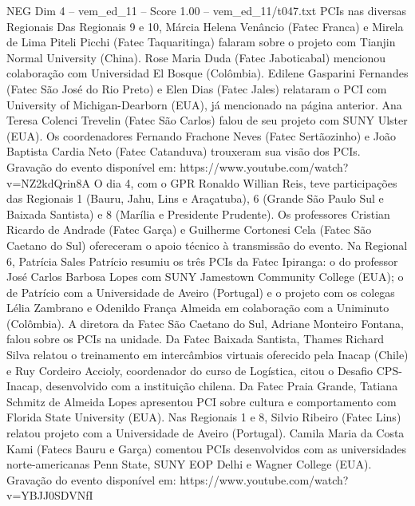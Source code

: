 \begin{textsample}{NEG Dim 4 – vem\_ed\_11 – Score 1.00 – vem\_ed\_11/t047.txt}  \label{ex:f4_neg_002}
PCIs nas diversas Regionais Das Regionais 9 e 10, Márcia Helena Venâncio (Fatec Franca) e Mirela de Lima Piteli Picchi (Fatec Taquaritinga) falaram sobre o projeto com Tianjin Normal University (China).
Rose Maria Duda (Fatec Jaboticabal) mencionou colaboração com Universidad El Bosque (Colômbia).
Edilene Gasparini Fernandes (Fatec São José do Rio Preto) e Elen Dias (Fatec Jales) relataram o PCI com University of Michigan-Dearborn (EUA), já mencionado na página anterior.
Ana Teresa Colenci Trevelin (Fatec São Carlos) falou de seu projeto com SUNY Ulster (EUA).
Os coordenadores Fernando Frachone Neves (Fatec Sertãozinho) e João Baptista Cardia Neto (Fatec Catanduva) trouxeram sua visão dos PCIs.
Gravação do evento disponível em: https://www.youtube.com/watch?v=NZ2kdQrin8A O dia 4, com o GPR Ronaldo Willian Reis, teve participações das Regionais 1 (Bauru, Jahu, Lins e Araçatuba), 6 (Grande São Paulo Sul e Baixada Santista) e 8 (Marília e Presidente Prudente).
Os professores Cristian Ricardo de Andrade (Fatec Garça) e Guilherme Cortonesi Cela (Fatec São Caetano do Sul) ofereceram o apoio técnico à transmissão do evento.
Na Regional 6, Patrícia Sales Patrício resumiu os três PCIs da Fatec Ipiranga: o do professor José Carlos Barbosa Lopes com SUNY Jamestown Community College (EUA); o de Patrício com a Universidade de Aveiro (Portugal) e o projeto com os colegas Lélia Zambrano e Odenildo França Almeida em colaboração com a Uniminuto (Colômbia).
A diretora da Fatec São Caetano do Sul, Adriane Monteiro Fontana, falou sobre os PCIs na unidade.
Da Fatec Baixada Santista, Thames Richard Silva relatou o treinamento em intercâmbios virtuais oferecido pela Inacap (Chile) e Ruy Cordeiro Accioly, coordenador do curso de Logística, citou o Desafio CPS-Inacap, desenvolvido com a instituição chilena.
Da Fatec Praia Grande, Tatiana Schmitz de Almeida Lopes apresentou PCI sobre cultura e comportamento com Florida State University (EUA).
Nas Regionais 1 e 8, Silvio Ribeiro (Fatec Lins) relatou projeto com a Universidade de Aveiro (Portugal).
Camila Maria da Costa Kami (Fatecs Bauru e Garça) comentou PCIs desenvolvidos com as universidades norte-americanas Penn State, SUNY EOP Delhi e Wagner College (EUA).
Gravação do evento disponível em: https://www.youtube.com/watch?v=YBJJ0SDVNfI

\end{textsample}
